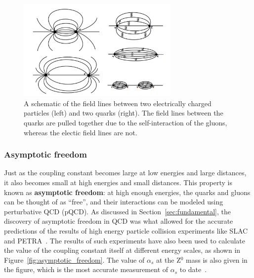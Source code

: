\begin{figure}[ht]
    \centering
    \includegraphics[width=0.7\textwidth]{figures/introduction/electric_color_fields.png}
    \caption{A schematic of the field lines between two electrically charged particles (left) and two quarks (right). The field lines between the quarks are pulled together due to the self-interaction of the gluons, whereas the electic field lines are not.}
    \label{fig:field_line_differences}
\end{figure}

\subsubsection{Asymptotic freedom}
\label{sec:qcd_asymptotic_freedom}

Just as the coupling constant becomes large at low energies and large distances, it also becomes small at high energies and small distances. This property is known as \textbf{asymptotic freedom}: at high enough energies, the quarks and gluons can be thought of as ``free'', and their interactions can be modeled using perturbative QCD (pQCD). As discussed in Section~\ref{sec:fundamental}, the discovery of asymptotic freedom in QCD was what allowed for the accurate predictions of the results of high energy particle collision experiments like SLAC~\cite{SLAC} and PETRA~\cite{PETRA}. The results of such experiments have also been used to calculate the value of the coupling constant itself at different energy scales, as shown in Figure~\ref{fig:asymptotic_freedom}. The value of $\alpha_s$ at the Z$^0$ mass is also given in the figure, which is the most accurate measurement of $\alpha_s$ to date~\cite{PDG}. 

